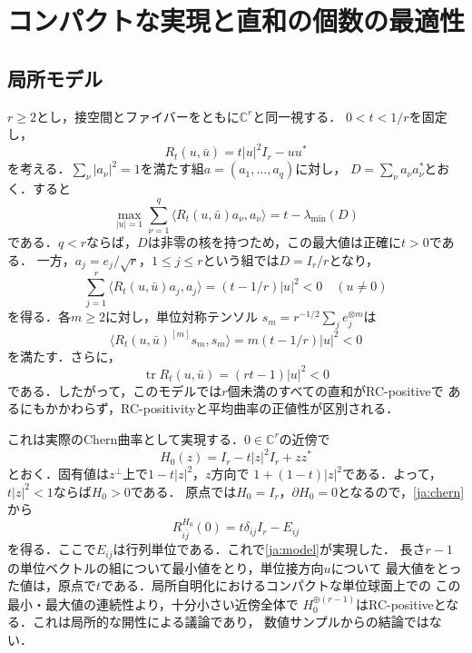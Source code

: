 \documentclass[12pt]{amsart}
\theoremstyle{definition}
\theoremstyle{remark}
\numberwithin{equation}{section}
\DeclareMathOperator{\tr}{tr}
\theoremstyle{definition}
\begin{document}
\section{コンパクトな実現と直和の個数の最適性}
\label{ja:compact}

\subsection{局所モデル}
$r\geq2$とし，接空間とファイバーをともに$\mathbb C^r$と同一視する．
$0<t<1/r$を固定し，
\begin{equation}\label{ja:model}
 R_t(u,\bar u)=t|u|^2I_r-uu^*
\end{equation}
を考える．$\sum_\nu|a_\nu|^2=1$を満たす組$a=(a_1,\ldots,a_q)$に対し，
$D=\sum_\nu a_\nu a_\nu^*$とおく．すると
\begin{equation}\label{ja:margin}
 \max_{|u|=1}\sum_{\nu=1}^q\langle R_t(u,\bar u)a_\nu,a_\nu\rangle
 =t-\lambda_{\min}(D)
\end{equation}
である．$q<r$ならば，$D$は非零の核を持つため，この最大値は正確に$t>0$である．
一方，$a_j=e_j/\sqrt r$，$1\leq j\leq r$という組では$D=I_r/r$となり，
\begin{equation}\label{ja:badtuple}
 \sum_{j=1}^r\langle R_t(u,\bar u)a_j,a_j\rangle
 =(t-1/r)|u|^2<0\quad(u\ne0)
\end{equation}
を得る．各$m\geq2$に対し，単位対称テンソル
$s_m=r^{-1/2}\sum_je_j^{\otimes m}$は
\begin{equation}\label{ja:badtensor}
 \langle R_t(u,\bar u)^{[m]}s_m,s_m\rangle
 =m(t-1/r)|u|^2<0
\end{equation}
を満たす．さらに，
\begin{equation}\label{ja:baddet}
 \tr R_t(u,\bar u)=(rt-1)|u|^2<0
\end{equation}
である．したがって，このモデルでは$r$個未満のすべての直和がRC-positiveで
あるにもかかわらず，RC-positivityと平均曲率の正値性が区別される．

これは実際のChern曲率として実現する．$0\in\mathbb C^r$の近傍で
\begin{equation}\label{ja:localmetric}
 H_0(z)=I_r-t|z|^2I_r+zz^*
\end{equation}
とおく．固有値は$z^\perp$上で$1-t|z|^2$，$z$方向で
$1+(1-t)|z|^2$である．よって，$t|z|^2<1$ならば$H_0>0$である．
原点では$H_0=I_r$，$\partial H_0=0$となるので，\eqref{ja:chern}から
\[
 R^{H_0}_{i\bar j}(0)=t\delta_{ij}I_r-E_{ij}
\]
を得る．ここで$E_{ij}$は行列単位である．これで\eqref{ja:model}が実現した．
長さ$r-1$の単位ベクトルの組について最小値をとり，単位接方向$u$について
最大値をとった値は，原点で$t$である．局所自明化におけるコンパクトな単位球面上での
この最小・最大値の連続性より，十分小さい近傍全体で
$H_0^{\oplus(r-1)}$はRC-positiveとなる．これは局所的な開性による議論であり，
数値サンプルからの結論ではない．
\end{document}
